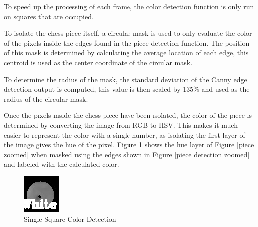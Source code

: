 \documentclass[journal]{IEEEtran}
\begin{document}
To speed up the processing of each frame, the color detection function is only run on squares that are occupied.

To isolate the chess piece itself, a circular mask is used to only evaluate the color of the pixels inside the edges found in the piece detection function. The position of this mask is determined by calculating the average location of each edge, this centroid is used as the center coordinate of the circular mask.

To determine the radius of the mask, the standard deviation of the Canny edge detection output is computed, this value is then scaled by 135\% and used as the radius of the circular mask.

Once the pixels inside the chess piece have been isolated, the color of the piece is determined by converting the image from RGB to HSV. This makes it much easier to represent the color with a single number, as isolating the first layer of the image gives the hue of the pixel. Figure \ref{color zoomed} shows the hue layer of Figure \ref{piece zoomed} when masked using the edges shown in Figure \ref{piece detection zoomed} and labeled with the calculated color.

\begin{figure}[!ht]
	\centering
	\includegraphics[width=\linewidth]{Images/ColorDetection340Zoomed.jpg}
	\caption{Single Square Color Detection}
	\label{color zoomed}
\end{figure}
\end{document}
